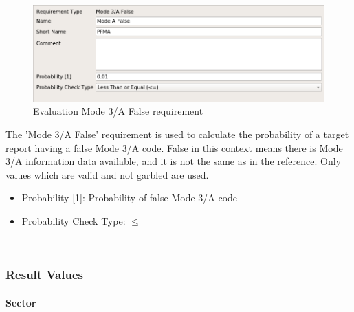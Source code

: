 \begin{figure}[H]
    \includegraphics[width=14cm,frame]{figures/eval_req_m3a_false.png}
  \caption{Evaluation Mode 3/A False requirement}
\end{figure}

The 'Mode 3/A False' requirement is used to calculate the probability of a target report having a false Mode 3/A code. False in this context means there is Mode 3/A information data available, and it is not the same as in the reference. Only values which are valid and not garbled are used. \\

\begin{itemize}  
\item Probability [1]: Probability of false Mode 3/A code
\item Probability Check Type: $\leq$
\end{itemize}
\ \\

\subsubsection{Result Values}

\paragraph{Sector}


